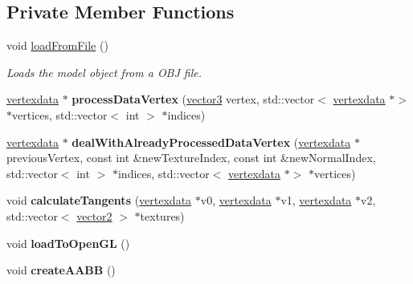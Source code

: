 \subsection*{Private Member Functions}
\begin{DoxyCompactItemize}
\item 
void \hyperlink{classflounder_1_1model_a1a21185a26ebe3645d41aaee86e897de}{load\+From\+File} ()
\begin{DoxyCompactList}\small\item\em Loads the model object from a O\+BJ file. \end{DoxyCompactList}\item 
\mbox{\label{classflounder_1_1model_a24e81bf6b3ec2c428975e6419ebf18ca}} 
\hyperlink{classflounder_1_1vertexdata}{vertexdata} $\ast$ {\bfseries process\+Data\+Vertex} (\hyperlink{classflounder_1_1vector3}{vector3} vertex, std\+::vector$<$ \hyperlink{classflounder_1_1vertexdata}{vertexdata} $\ast$$>$ $\ast$vertices, std\+::vector$<$ int $>$ $\ast$indices)
\item 
\mbox{\label{classflounder_1_1model_a2a5bafcc900a83c0add5b20d3f6ee0c0}} 
\hyperlink{classflounder_1_1vertexdata}{vertexdata} $\ast$ {\bfseries deal\+With\+Already\+Processed\+Data\+Vertex} (\hyperlink{classflounder_1_1vertexdata}{vertexdata} $\ast$previous\+Vertex, const int \&new\+Texture\+Index, const int \&new\+Normal\+Index, std\+::vector$<$ int $>$ $\ast$indices, std\+::vector$<$ \hyperlink{classflounder_1_1vertexdata}{vertexdata} $\ast$$>$ $\ast$vertices)
\item 
\mbox{\label{classflounder_1_1model_ad8eafa9f1c1afde95f7b4035a7e83f59}} 
void {\bfseries calculate\+Tangents} (\hyperlink{classflounder_1_1vertexdata}{vertexdata} $\ast$v0, \hyperlink{classflounder_1_1vertexdata}{vertexdata} $\ast$v1, \hyperlink{classflounder_1_1vertexdata}{vertexdata} $\ast$v2, std\+::vector$<$ \hyperlink{classflounder_1_1vector2}{vector2} $>$ $\ast$textures)
\item 
\mbox{\label{classflounder_1_1model_acf5f1c0df19c406ff98214b376e0d997}} 
void {\bfseries load\+To\+Open\+GL} ()
\item 
\mbox{\label{classflounder_1_1model_adc9de7f0f5a067bd1d1a775986bd3578}} 
void {\bfseries create\+A\+A\+BB} ()
\end{DoxyCompactItemize}
